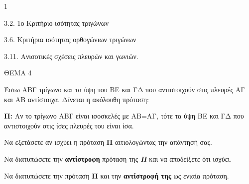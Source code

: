 \begin{ylh}{1}
    \item 3.2. 1ο Κριτήριο ισότητας τριγώνων
    \item 3.6. Κριτήρια ισότητας ορθογώνιων τριγώνων
    \item 3.11. Ανισοτικές σχέσεις πλευρών και γωνιών.
\end{ylh}

ΘΕΜΑ 4

Έστω ΑΒΓ τρίγωνο και τα ύψη του ΒΕ και ΓΔ που αντιστοιχούν στις πλευρές ΑΓ και ΑΒ αντίστοιχα. Δίνεται η ακόλουθη πρόταση:

\textbf{Π:} Αν το τρίγωνο ΑΒΓ είναι ισοσκελές με ΑΒ=ΑΓ, τότε τα ύψη ΒΕ και ΓΔ που αντιστοιχούν στις ίσες πλευρές του είναι ίσα.

\begin{alist}
\item Να εξετάσετε αν ισχύει η πρόταση \textbf{Π} αιτιολογώντας την απάντησή σας.


\item Να διατυπώσετε την \textbf{αντίστροφη} πρόταση της \emph{\textbf{Π}} και να αποδείξετε ότι ισχύει.


\item Να διατυπώσετε την πρόταση \textbf{Π} και την \textbf{αντίστροφή της} ως ενιαία πρόταση.

\end{alist}

